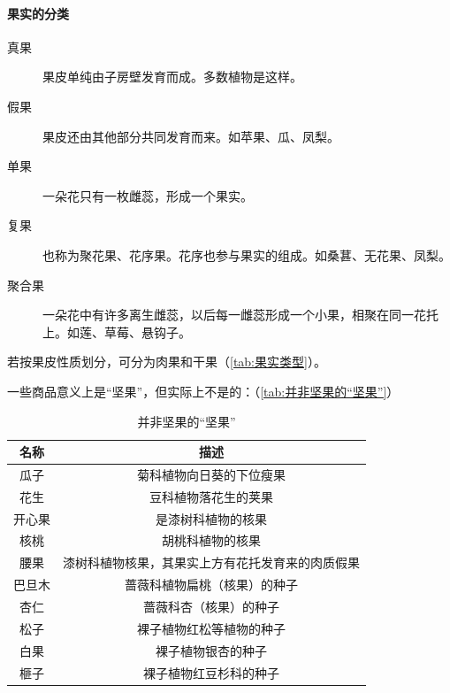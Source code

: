 \paragraph{果实的分类}

\begin{description}
	\item[真果] 果皮单纯由子房壁发育而成。多数植物是这样。
	\item[假果] 果皮还由其他部分共同发育而来。如苹果、瓜、凤梨。
\end{description}

\begin{description}
	\item[单果] 一朵花只有一枚雌蕊，形成一个果实。
	\item[复果] 也称为聚花果、花序果。花序也参与果实的组成。如桑葚、无花果、凤梨。
	\item[聚合果] 一朵花中有许多离生雌蕊，以后每一雌蕊形成一个小果，相聚在同一花托上。如莲、草莓、悬钩子。
\end{description}

若按果皮性质划分，可分为肉果和干果（\autoref{tab:果实类型}）。


一些商品意义上是“坚果”，但实际上不是的：（\autoref{tab:并非坚果的“坚果”}）

\begin{table}
	\begin{tabularx}{\textwidth}{|c|C|}
		\hline
		\textbf{名称} & \textbf{描述} \\
		\hline
		瓜子 & 菊科植物向日葵的下位瘦果 \\
		\hline
		花生 & 豆科植物落花生的荚果 \\
		\hline
		开心果 & 是漆树科植物的核果 \\
		\hline
		核桃 & 胡桃科植物的核果 \\
		\hline
		腰果 & 漆树科植物核果，其果实上方有花托发育来的肉质假果 \\
		\hline
		巴旦木 & 蔷薇科植物扁桃（核果）的种子 \\
		\hline
		杏仁 & 蔷薇科杏（核果）的种子 \\
		\hline
		松子 & 裸子植物红松等植物的种子 \\
		\hline
		白果 & 裸子植物银杏的种子 \\
		\hline
		榧子 & 裸子植物红豆杉科的种子 \\
		\hline
	\end{tabularx}
	\caption{并非坚果的“坚果”}
	\label{tab:并非坚果的“坚果”}
\end{table}

